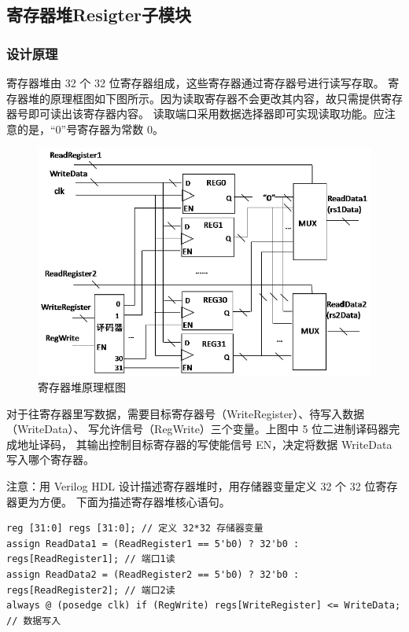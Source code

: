 \documentclass[12pt,hyperref,a4paper,UTF8]{ctexart}
\begin{document}
  \newpage

\subsection{寄存器堆Resigter子模块}
\subsubsection*{\Large 设计原理}
\normalsize
寄存器堆由 32 个 32 位寄存器组成，这些寄存器通过寄存器号进行读写存取。
寄存器堆的原理框图如下图所示。因为读取寄存器不会更改其内容，故只需提供寄存器号即可读出该寄存器内容。
读取端口采用数据选择器即可实现读取功能。应注意的是，“0”号寄存器为常数 0。

    \begin{figure}[H]
        \centering
        \includegraphics[width=1\textwidth]{figures/fig/image5.png}
        \caption{寄存器堆原理框图}
    \end{figure}



对于往寄存器里写数据，需要目标寄存器号（WriteRegister）、待写入数据（WriteData）、
写允许信号（RegWrite）三个变量。上图中 5 位二进制译码器完成地址译码，
其输出控制目标寄存器的写使能信号 EN，决定将数据 WriteData 写入哪个寄存器。

注意：用 Verilog HDL 设计描述寄存器堆时，用存储器变量定义 32 个 32 位寄存器更为方便。
下面为描述寄存器堆核心语句。

\begin{verbatim}
reg [31:0] regs [31:0]; // 定义 32*32 存储器变量
assign ReadData1 = (ReadRegister1 == 5'b0) ? 32'b0 : regs[ReadRegister1]; // 端口1读
assign ReadData2 = (ReadRegister2 == 5'b0) ? 32'b0 : regs[ReadRegister2]; // 端口2读
always @ (posedge clk) if (RegWrite) regs[WriteRegister] <= WriteData; // 数据写入
\end{verbatim}
\end{document}
